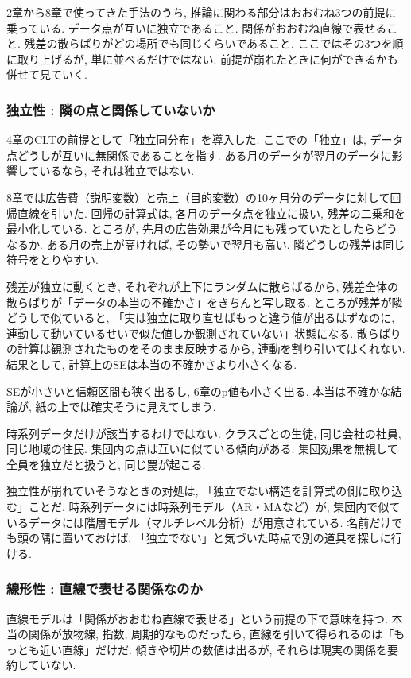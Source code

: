2章から8章で使ってきた手法のうち, 推論に関わる部分はおおむね3つの前提に乗っている.
データ点が互いに独立であること. 関係がおおむね直線で表せること. 残差の散らばりがどの場所でも同じくらいであること.
ここではその3つを順に取り上げるが, 単に並べるだけではない. 前提が崩れたときに何ができるかも併せて見ていく.

\subsubsection*{独立性 : 隣の点と関係していないか}

4章のCLTの前提として「独立同分布」を導入した.
ここでの「独立」は, データ点どうしが互いに無関係であることを指す.
ある月のデータが翌月のデータに影響しているなら, それは独立ではない.

8章では広告費（説明変数）と売上（目的変数）の10ヶ月分のデータに対して回帰直線を引いた.
回帰の計算式は, 各月のデータ点を独立に扱い, 残差の二乗和を最小化している.
ところが, 先月の広告効果が今月にも残っていたとしたらどうなるか.
ある月の売上が高ければ, その勢いで翌月も高い. 隣どうしの残差は同じ符号をとりやすい.

残差が独立に動くとき, それぞれが上下にランダムに散らばるから, 残差全体の散らばりが「データの本当の不確かさ」をきちんと写し取る.
ところが残差が隣どうしで似ていると, 「実は独立に取り直せばもっと違う値が出るはずなのに, 連動して動いているせいで似た値しか観測されていない」状態になる.
散らばりの計算は観測されたものをそのまま反映するから, 連動を割り引いてはくれない.
結果として, 計算上のSEは本当の不確かさより小さくなる.

SEが小さいと信頼区間も狭く出るし, 6章のp値も小さく出る.
本当は不確かな結論が, 紙の上では確実そうに見えてしまう.

時系列データだけが該当するわけではない.
クラスごとの生徒, 同じ会社の社員, 同じ地域の住民. 集団内の点は互いに似ている傾向がある.
集団効果を無視して全員を独立だと扱うと, 同じ罠が起こる.

独立性が崩れていそうなときの対処は, 「独立でない構造を計算式の側に取り込む」ことだ.
時系列データには時系列モデル（AR・MAなど）が, 集団内で似ているデータには階層モデル（マルチレベル分析）が用意されている.
名前だけでも頭の隅に置いておけば, 「独立でない」と気づいた時点で別の道具を探しに行ける.

\subsubsection*{線形性 : 直線で表せる関係なのか}

直線モデルは「関係がおおむね直線で表せる」という前提の下で意味を持つ.
本当の関係が放物線, 指数, 周期的なものだったら, 直線を引いて得られるのは「もっとも近い直線」だけだ.
傾きや切片の数値は出るが, それらは現実の関係を要約していない.

